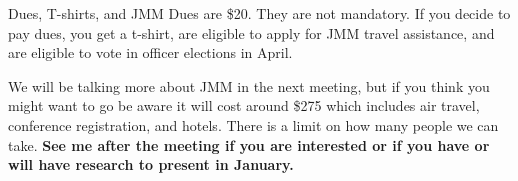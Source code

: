 \documentclass[xcolor=dvipsnames]{beamer}
\begin{document}
\begin{frame}{Dues, T-shirts, and JMM}
Dues are \$20. They are not mandatory. \newline
If you decide to pay dues, you get a t-shirt,  are eligible to apply for JMM travel assistance, and are eligible to vote in officer elections in April.\newline


\vspace{1cm}
We will be talking more about JMM in the next meeting, but if you think you might want to go be aware it will cost around \$275 which includes air travel, conference registration, and hotels. There is a limit on how many people we can take. \textbf{See me after the meeting if you are interested or if you have or will have research to present in January.}

\end{frame}
\end{document}
